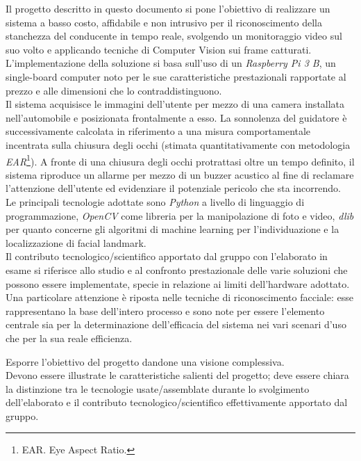\documentclass[12pt]{article}
\begin{document}
Il progetto descritto in questo documento si pone l'obiettivo di realizzare un sistema a basso costo, affidabile e non intrusivo per il riconoscimento della stanchezza del conducente in tempo reale, svolgendo un monitoraggio video sul suo volto e applicando tecniche di Computer Vision sui frame catturati. L'implementazione della soluzione si basa sull'uso di un \textit{Raspberry Pi 3 B}, un single-board computer noto per le sue caratteristiche prestazionali rapportate al prezzo e alle dimensioni che lo contraddistinguono.\\
Il sistema acquisisce le immagini dell'utente per mezzo di una camera installata nell'automobile e posizionata frontalmente a esso. La sonnolenza del guidatore è successivamente calcolata in riferimento a una misura comportamentale incentrata sulla chiusura degli occhi (stimata quantitativamente con metodologia \textit{EAR}\footnote{EAR. Eye Aspect Ratio.}\cite{EAR}). A fronte di una chiusura degli occhi protrattasi oltre un tempo definito, il sistema riproduce un allarme per mezzo di un buzzer acustico al fine di reclamare l'attenzione dell'utente ed evidenziare il potenziale pericolo che sta incorrendo.\\
Le principali tecnologie adottate sono \textit{Python} a livello di linguaggio di programmazione, \textit{OpenCV}\cite{OpenCV} come libreria per la manipolazione di foto e video, \textit{dlib}\cite{Dlib} per quanto concerne gli algoritmi di machine learning per l'individuazione e la localizzazione di facial landmark.\\
Il contributo tecnologico/scientifico apportato dal gruppo con l'elaborato in esame si riferisce allo studio e al confronto prestazionale delle varie soluzioni che possono essere implementate, specie in relazione ai limiti dell'hardware adottato. Una particolare attenzione è riposta nelle tecniche di riconoscimento facciale: esse rappresentano la base dell'intero processo e sono note per essere l'elemento centrale sia per la determinazione dell'efficacia del sistema nei vari scenari d'uso che per la sua reale efficienza.

\iffalse
Esporre l’obiettivo del progetto dandone una visione complessiva.\\
Devono essere illustrate le caratteristiche salienti del progetto; deve essere chiara la distinzione tra le tecnologie usate/assemblate durante lo svolgimento dell’elaborato e il contributo tecnologico/scientifico effettivamente apportato dal gruppo.\\
\end{document}
